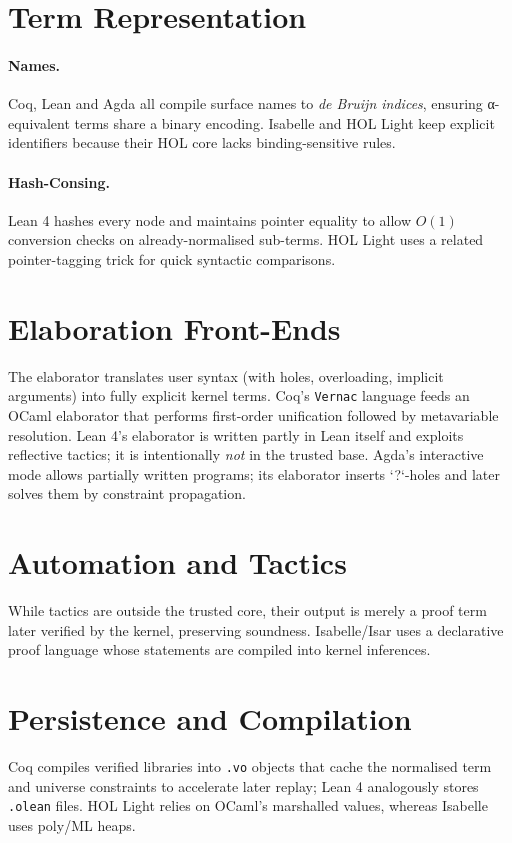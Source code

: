 \documentclass[11pt,a4paper]{article}
\newcommand{\code}[1]{\texttt{#1}}
\begin{document}
\section{Term Representation}
\paragraph{Names.}  Coq, Lean and Agda all compile surface names to \emph{de Bruijn indices},
ensuring α-equivalent terms share a binary encoding\cite{coq-core,lean4-survey}.  
Isabelle and HOL Light keep explicit identifiers because their HOL core lacks binding-sensitive rules\cite{isabelle-manual,hollight-tut}.  

\paragraph{Hash-Consing.}  Lean 4 hashes every node and maintains pointer equality to allow \(O(1)\) conversion checks on already-normalised sub-terms\cite{lean4-survey}.  HOL Light uses a related pointer-tagging trick for quick syntactic comparisons\cite{hollight-tut}.  

\section{Elaboration Front-Ends}
The elaborator translates user syntax (with holes, overloading, implicit arguments) into fully explicit kernel terms.
Coq’s \code{Vernac} language feeds an OCaml elaborator that performs first-order unification followed by metavariable resolution\cite{coq-arch}.  
Lean 4’s elaborator is written partly in Lean itself and exploits reflective tactics; it is intentionally \emph{not} in the trusted base\cite{lean4lean}.  
Agda’s interactive mode allows partially written programs; its elaborator inserts `?`-holes and later solves them by constraint propagation\cite{agda-guide}.  

\section{Automation and Tactics}
While tactics are outside the trusted core, their output is merely a proof term later verified by the kernel, preserving soundness\cite{coq-arch}.  
Isabelle/Isar uses a declarative proof language whose statements are compiled into kernel inferences\cite{isabelle-manual}.  

\section{Persistence and Compilation}
Coq compiles verified libraries into \code{.vo} objects that cache the normalised term and universe constraints to accelerate later replay; Lean 4 analogously stores \code{.olean} files\cite{lean4-survey}.  
HOL Light relies on OCaml’s marshalled values, whereas Isabelle uses poly/ML heaps\cite{hollight-tut,isabelle-manual}.  
\end{document}
